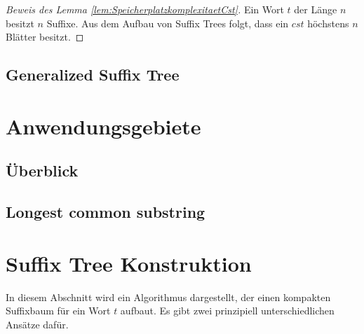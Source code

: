 \documentclass[12pt]{report}
\begin{document}
\begin{proof}[Beweis des Lemma \ref{lem:SpeicherplatzkomplexitaetCst}]
Ein Wort $t$ der Länge $n$ besitzt $n$ Suffixe. Aus dem Aufbau von Suffix Trees folgt, dass ein $cst$ höchstens $n$ Blätter besitzt.
\end{proof}
\subsection{Generalized Suffix Tree}
\label{sec:GeneralizedSuffixTree}

\section{Anwendungsgebiete}
\label{sec:Anwendungsgebiete}

\subsection{Überblick}
\label{sec:Ueberblick}

\subsection{Longest common substring}
\label{sec:longestCommonSubstring}

\section{Suffix Tree Konstruktion}
\label{sec:SuffixTreeKonstruktion}

In diesem Abschnitt wird ein Algorithmus dargestellt, der einen kompakten Suffixbaum für ein Wort $t$ aufbaut. Es gibt zwei prinzipiell unterschiedlichen Ansätze dafür.
\end{document}
